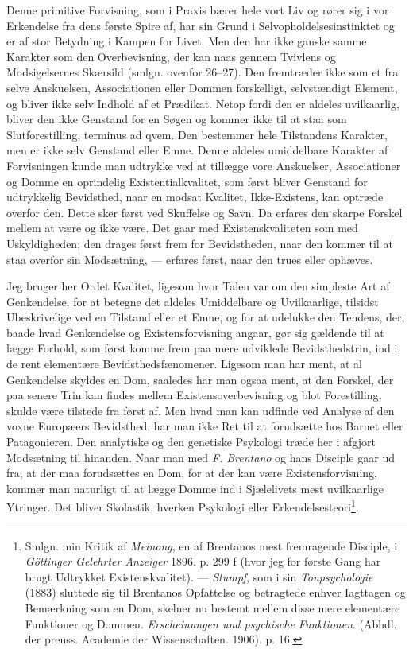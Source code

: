 \documentclass[12pt,a4paper]{book}
\newcommand{\apage}[1]{\marginnote{\footnotesize\textit{[#1]}}}
\begin{document}
Denne primitive Forvisning, som i Praxis bærer hele vort Liv og rører
sig i vor Erkendelse fra dens første Spire af, har sin Grund i
Selvopholdelsesinstinktet og er af stor Betydning i Kampen for Livet.
Men den har ikke ganske samme Karakter som den Overbevisning, der kan
naas gennem Tvivlens og Modsigelsernes Skærsild (smlgn. ovenfor 26--27).
Den fremtræder ikke som et fra selve Anskuelsen, Associationen eller
Dommen forskelligt, selvstændigt Element, og bliver ikke selv Indhold af
et Prædikat. Netop fordi den er aldeles uvilkaarlig, bliver den ikke
Genstand for en Søgen og kommer ikke til at staa som Slutforestilling,
terminus ad qvem. Den bestemmer hele Tilstandens Karakter, men er ikke
selv Genstand eller Emne. Denne aldeles umiddelbare Karakter af
Forvisningen kunde man udtrykke ved at tillægge vore Anskuelser,
Associationer og Domme en oprindelig Existentialkvalitet, som først
bliver Genstand for udtrykkelig Bevidsthed, naar en modsat Kvalitet,
Ikke-Existens, kan optræde overfor den. Dette sker først ved Skuffelse
og Savn. Da erfares den skarpe Forskel mellem at være og ikke være. Det
gaar med Existenskvaliteten som med Uskyldigheden; den drages først frem
for Bevidstheden, naar den kommer til at staa overfor sin Modsætning,
--- erfares først, naar den trues eller ophæves.

Jeg bruger her Ordet Kvalitet, ligesom hvor Talen var om \apage{102} den simpleste
Art af Genkendelse, for at betegne det aldeles Umiddelbare og
Uvilkaarlige, tilsidst Ubeskrivelige ved en Tilstand eller et Emne, og
for at udelukke den Tendens, der, baade hvad Genkendelse og
Existensforvisning angaar, gør sig gældende til at lægge Forhold, som
først komme frem paa mere udviklede Bevidsthedstrin, ind i de rent
elementære Bevidsthedsfænomener. Ligesom man har ment, at al Genkendelse
skyldes en Dom, saaledes har man ogsaa ment, at den Forskel, der paa
senere Trin kan findes mellem Existensoverbevisning og blot Forestilling,
skulde være tilstede fra først af. Men hvad man kan udfinde ved Analyse
af den voxne Europæers Bevidsthed, har man ikke Ret til at forudsætte
hos Barnet eller Patagonieren. Den analytiske og den genetiske Psykologi
træde her i afgjort Modsætning til hinanden. Naar man med \emph{F.
Brentano} og hans Disciple gaar ud fra, at der maa forudsættes en Dom,
for at der kan være Existensforvisning, kommer man naturligt til at
lægge Domme ind i Sjælelivets mest uvilkaarlige Ytringer. Det bliver
Skolastik, hverken Psykologi eller Erkendelsesteori\footnote{Smlgn. min
Kritik af \emph{Meinong}, en af Brentanos mest fremragende Disciple, i
\emph{Göttinger Gelehrter Anzeiger} 1896. p. 299 f (hvor jeg for første
Gang har brugt Udtrykket Existenskvalitet). --- \emph{Stumpf}, som i sin
\emph{Tonpsychologie} (1883) sluttede sig til Brentanos Opfattelse og
betragtede enhver Iagttagen og Bemærkning som en Dom, skelner nu bestemt
mellem disse mere elementære Funktioner og Dommen. \emph{Erscheinungen
und psychische Funktionen}. (Abhdl. der preuss. Academie der
Wissenschaften. 1906). p. 16.}.
\end{document}
